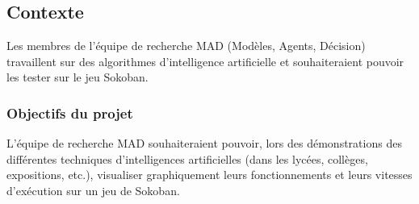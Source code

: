 \documentclass[a4paper,12pt]{article} %
\begin{document}
\subsection{Contexte}
Les membres de l'équipe de recherche MAD (Modèles, Agents, Décision) travaillent sur des algorithmes d'intelligence artificielle et souhaiteraient pouvoir les tester sur le jeu Sokoban.
\newline
\subsubsection{Objectifs du projet}
L'équipe de recherche MAD souhaiteraient pouvoir, lors des démonstrations des différentes techniques
d’intelligences artificielles (dans les lycées, collèges,
expositions, etc.), visualiser graphiquement leurs fonctionnements et leurs vitesses d’exécution sur un jeu de Sokoban.
\newline
\end{document}
